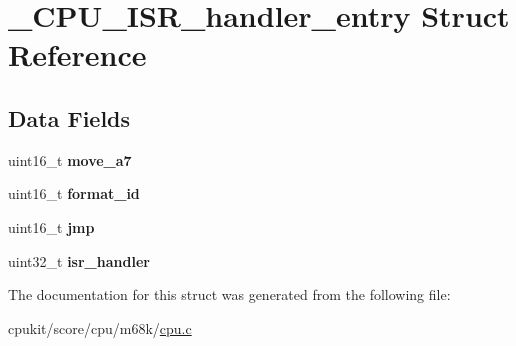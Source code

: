 \hypertarget{struct__CPU__ISR__handler__entry}{}\section{\+\_\+\+C\+P\+U\+\_\+\+I\+S\+R\+\_\+handler\+\_\+entry Struct Reference}
\label{struct__CPU__ISR__handler__entry}
\subsection*{Data Fields}
\begin{DoxyCompactItemize}
\item 
\mbox{\label{struct__CPU__ISR__handler__entry_a8a135a3c7f542677a3a096e5339d4124}} 
uint16\+\_\+t {\bfseries move\+\_\+a7}
\item 
\mbox{\label{struct__CPU__ISR__handler__entry_ab7c4164f4aa89db49941638c6c8ffc07}} 
uint16\+\_\+t {\bfseries format\+\_\+id}
\item 
\mbox{\label{struct__CPU__ISR__handler__entry_a827bff0daf9cd8e6a937e434fcb61bd9}} 
uint16\+\_\+t {\bfseries jmp}
\item 
\mbox{\label{struct__CPU__ISR__handler__entry_a90c45aeec26b25ff9ffdd88d55d031c5}} 
uint32\+\_\+t {\bfseries isr\+\_\+handler}
\end{DoxyCompactItemize}


The documentation for this struct was generated from the following file\+:\begin{DoxyCompactItemize}
\item 
cpukit/score/cpu/m68k/\mbox{\hyperlink{cpukit_2score_2cpu_2m68k_2cpu_8c}{cpu.\+c}}\end{DoxyCompactItemize}
